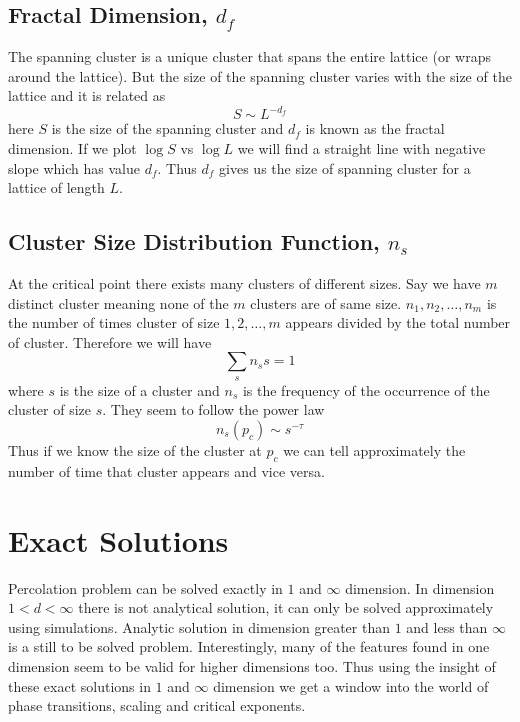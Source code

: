 	\subsection{Fractal Dimension, $d_f$} 
		\label{subsect:fractal-dim}
		The spanning cluster is a unique cluster that spans the entire lattice (or wraps around the lattice). But the size of the spanning cluster varies with the size of the lattice and it is related as
		\begin{equation}
			S \sim L^{-d_f}
		\end{equation}
		here $S$ is the size of the spanning cluster and $d_f$ is known as the fractal dimension. If we plot $\log S$ vs $\log L$ we will find a straight line with negative slope which has value $d_f$. Thus $d_f$ gives us the size of spanning cluster for a lattice of length $L$.
	
	\subsection{Cluster Size Distribution Function, $n_s$} \label{subsect:cluster-size-dist-func}
		At the critical point there exists many clusters of different sizes. Say we have $m$ distinct cluster meaning none of the $m$ clusters are of same size. $n_1, n_2, \ldots, n_m$ is the number of times cluster of size $1, 2, \ldots, m$ appears divided by the total number of cluster. Therefore we will have
		\begin{equation}
			\sum_{s} n_s s = 1
		\end{equation}
		where $s$ is the size of a cluster and $n_s$ is the frequency of the occurrence of the cluster of size $s$. They seem to follow the power law
		\begin{equation}
		n_s(p_c)\sim s^{-\tau}
		\end{equation}
		Thus if we know the size of the cluster at $p_c$ we can tell approximately the number of time that cluster appears and vice versa.
	

\section{Exact Solutions}
	Percolation problem can be solved exactly in $1$ and $\infty$ dimension. In dimension $1 < d < \infty$ there is not analytical solution, it can only be solved approximately using simulations. Analytic solution in dimension greater than $1$ and less than $\infty$ is a still to be solved problem. Interestingly, many of the features found in one dimension seem to be valid for higher dimensions too. Thus using the insight of these exact solutions in $1$ and $\infty$ dimension we get a window into the world of phase transitions, scaling and critical exponents.
